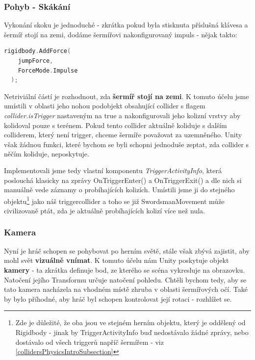 \subsubsection*{Pohyb - Skákání}

Vykonání skoku je jednoduché - zkrátka pokud byla stisknuta příslušná klávesa a šermíř stojí na zemi, dodáme šermířovi nakonfigurovaný impuls - nějak takto:

\begin{lstlisting}[language=C, basicstyle=\fontsize{11}{13}\selectfont\ttfamily]
  rigidbody.AddForce(
    jumpForce,
    ForceMode.Impulse
  );
\end{lstlisting}

Netriviální částí je rozhodnout, zda \textbf{šermíř stojí na zemi}. K tomuto účelu jsme umístili v oblasti jeho nohou podobjekt obsahující collider s flagem \textit{collider.isTrigger} nastaveným na true a nakonfigurovali jeho kolizní vrstvy aby kolidoval pouze s terénem. Pokud tento collider aktuálně koliduje s dalším colliderem, který není trigger, chceme šermíře považovat za uzemněného. Unity však žádnou funkci, které bychom se byli schopni jednoduše zeptat, zda collider s něčím koliduje, neposkytuje. 

Implementovali jsme tedy vlastní komponentu \textit{TriggerActivityInfo}, která poslouchá klasicky na zprávy OnTriggerEnter() a OnTriggerExit() a dle nich si manuálně vede záznamy o probíhajících kolizích. Umístili jsme ji do stejného objektu\footnote{Zde je důležité, že oba jsou ve stejném herním objektu, který je oddělený od Rigidbody - jinak by TriggerActivityInfo buď nedostávalo žádné zprávy, nebo dostávalo od všech triggerů napříč šermířem - viz \ref{collidersPhysicsIntroSubsection}} jako náš triggercollider a toho se již SwordsmanMovement může civilizovaně ptát, zda je aktuálně probíhajících kolizí více než nula.

\subsubsection*{Kamera}

Nyní je hráč schopen se pohybovat po herním světě, stále však zbývá zajistit, aby mohl svět \textbf{vizuálně vnímat}. K tomuto účelu nám Unity poskytuje objekt \textbf{kamery} - ta zkrátka definuje bod, ze kterého se scéna vykresluje na obrazovku. Natočení jejího Transformu určuje natočení pohledu. Chtěli bychom tedy, aby se tato kamera nacházela na vhodném místě zhruba v oblasti šermířových očí. Také by bylo příhodné, aby hráč byl schopen kontrolovat její rotaci - rozhlížet se.

